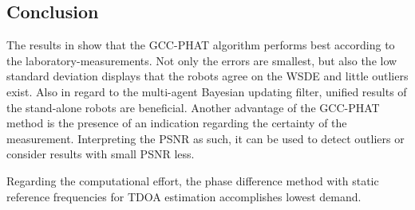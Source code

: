 \subsection{Conclusion}
\label{subsec:04_tdoaConclusion}

The results in  show
that the \ac{GCC-PHAT} algorithm performs best according to the
laboratory-measurements.
Not only the errors are smallest, but also the low standard deviation
displays that the robots agree on the \ac{WSDE} and little outliers exist.
Also in regard to the multi-agent Bayesian updating filter, unified
results of the stand-alone robots are beneficial.
Another advantage of the \ac{GCC-PHAT} method is the presence of
an indication regarding the certainty of the measurement.
Interpreting the \ac{PSNR} as such, it can be used to detect outliers
or consider results with small \ac{PSNR} less.

Regarding the computational effort, the phase difference method
with static reference frequencies for \ac{TDOA} estimation
accomplishes lowest demand.



